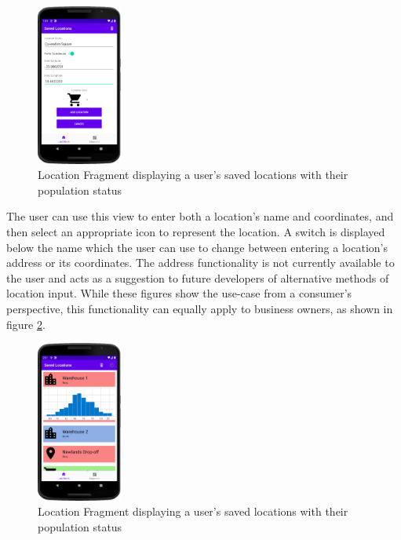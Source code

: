 \begin{figure}[ht]
    \centering
    \includegraphics[width=0.25\textwidth]{figures/EnterLocation.PNG}
    \caption{Location Fragment displaying a user's saved locations with their population status}
    \label{fig:enter_location}
\end{figure}

The user can use this view to enter both a location’s name and coordinates, and then select an appropriate icon to represent the location. A switch is displayed below the name which the user can use to change between entering a location’s address or its coordinates. The address functionality is not currently available to the user and acts as a suggestion to future developers of alternative methods of location input. While these figures show the use-case from a consumer’s perspective, this functionality can equally apply to business owners, as shown in figure \ref{fig:business_extended}.

\begin{figure}[ht]
    \centering
    \includegraphics[width=0.25\textwidth]{figures/BusinessExtended.PNG}
    \caption{Location Fragment displaying a user's saved locations with their population status}
    \label{fig:business_extended}
\end{figure}

